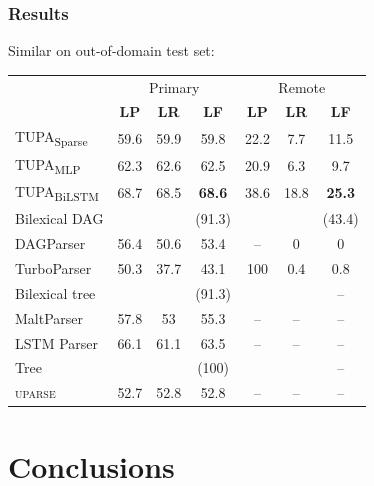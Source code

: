 \documentclass[t]{beamer}
\newcommand{\parser}[1]{TUPA\textsubscript{#1}}
\begin{document}
\begin{frame}
\frametitle{Results}
Similar on out-of-domain test set:
\begin{center}
	\begin{tabular}{l|ccc|ccc}
		& \multicolumn{3}{c|}{Primary} & \multicolumn{3}{c}{Remote} \\
		& \textbf{LP} & \textbf{LR} & \textbf{LF} & \textbf{LP} & \textbf{LR} & \textbf{LF} \\
		\hline
		\parser{Sparse}
		& 59.6 & 59.9 & 59.8 & 22.2 & 7.7 & 11.5 \\
		\parser{MLP}
		& 62.3 & 62.6 & 62.5 & 20.9 & 6.3 & 9.7 \\
		\parser{BiLSTM}
		& 68.7 & 68.5 & \textbf{68.6} & 38.6 & 18.8 & \textbf{25.3} \\
		\hline
		\footnotesize Bilexical DAG
		& & & \footnotesize (91.3) & & & \footnotesize (43.4) \\
		DAGParser
		& 56.4 & 50.6 & 53.4 & -- & 0 & 0 \\
		TurboParser
		& 50.3 & 37.7 & 43.1 & 100 & 0.4 & 0.8 \\
		\hline
		\footnotesize Bilexical tree
		& & & \footnotesize (91.3) & & & \footnotesize -- \\
		MaltParser
		& 57.8 & 53 & 55.3 & -- & -- & -- \\
		LSTM Parser
		& 66.1 & 61.1 & 63.5 & -- & -- & -- \\
		\hline
		\footnotesize Tree
		& & & \footnotesize (100) & & & \footnotesize -- \\
		\textsc{uparse}
		& 52.7 & 52.8 & 52.8 & -- & -- & --
	\end{tabular}
\end{center}
\end{frame}



\section{Conclusions}
\end{document}
